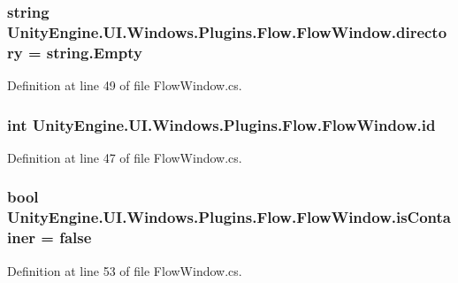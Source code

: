 \subsubsection[{directory}]{\setlength{\rightskip}{0pt plus 5cm}string Unity\+Engine.\+U\+I.\+Windows.\+Plugins.\+Flow.\+Flow\+Window.\+directory = string.\+Empty}\label{class_unity_engine_1_1_u_i_1_1_windows_1_1_plugins_1_1_flow_1_1_flow_window_ab4d26fb49529e5125f64ecb8333ef204}


Definition at line 49 of file Flow\+Window.\+cs.

\hypertarget{class_unity_engine_1_1_u_i_1_1_windows_1_1_plugins_1_1_flow_1_1_flow_window_aa104f440272c2c98112523a60b9f9426}{}
\subsubsection[{id}]{\setlength{\rightskip}{0pt plus 5cm}int Unity\+Engine.\+U\+I.\+Windows.\+Plugins.\+Flow.\+Flow\+Window.\+id}\label{class_unity_engine_1_1_u_i_1_1_windows_1_1_plugins_1_1_flow_1_1_flow_window_aa104f440272c2c98112523a60b9f9426}


Definition at line 47 of file Flow\+Window.\+cs.

\hypertarget{class_unity_engine_1_1_u_i_1_1_windows_1_1_plugins_1_1_flow_1_1_flow_window_a33d93fedb381d32058ee8d85407b2073}{}
\subsubsection[{is\+Container}]{\setlength{\rightskip}{0pt plus 5cm}bool Unity\+Engine.\+U\+I.\+Windows.\+Plugins.\+Flow.\+Flow\+Window.\+is\+Container = false}\label{class_unity_engine_1_1_u_i_1_1_windows_1_1_plugins_1_1_flow_1_1_flow_window_a33d93fedb381d32058ee8d85407b2073}


Definition at line 53 of file Flow\+Window.\+cs.

